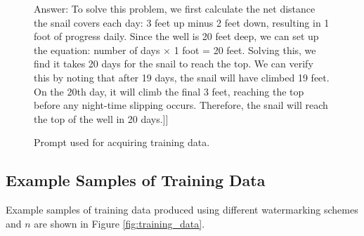 \begin{figure*}[h!]
\begin{tcolorbox}[colback=gray!10, colframe=black, rounded corners]
Answer: To solve this problem, we first calculate the net distance the snail covers each day: 3 feet up minus 2 feet down, 
resulting in 1 foot of progress daily. Since the well is 20 feet deep, we can set up the equation: number of days $\times$ 1 foot = 20 feet.  Solving this, we find it takes 20 days for the snail to reach the top. We can verify this by noting that after 19 days, the snail will 
have climbed 19 feet. On the 20th day, it will climb the final 3 feet, reaching the top before any night-time slipping occurs. 
Therefore, the snail will reach the top of the well in 20 days.]]
\end{tcolorbox}
\caption{Prompt used for acquiring training data.}
\label{fig:prompt}
\end{figure*}

\subsection{Example Samples of Training Data}
\label{sec:examples}
Example samples of training data produced using different watermarking schemes and $n$ are shown in Figure \ref{fig:training_data}.
